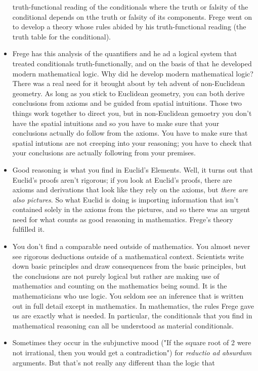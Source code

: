 \documentclass[12pt]{article}
\theoremstyle{definition}
\begin{document}
\begin{itemize}
truth-functional reading of the conditionals where the truth or falsity of the
conditional depends on tthe truth or falsity of its components. Frege went on
to develop a theory whose rules abided by his truth-functional reading (the
truth table for the conditional).
\item Frege has this analysis of the quantifiers and he ad a logical system
that treated conditionals truth-functionally, and on the basis of that he
developed modern mathematical logic. Why did he develop modern mathematical
logic? There was a real need for it brought about by teh advent of
non-Euclidean geometry. As long as you stick to Euclidean geometry, you can
both derive conclusions from axioms and be guided from spatial intuitions.
Those two things work together to direct you, but in non-Euclidean gemoetry you
don't have the spatial intuitions and so you have to make sure that your
conclusions actually do follow from the axioms. You have to make sure that
spatial intutions are not creeping into your reasoning; you have to check that
your conclusions are actually following from your premises.
\item Good reasoning is what you find in Euclid's Elements. Well, it turns out
that Euclid's proofs aren't rigorous; if you look at Euclid's proofs, there are
axioms and derivations that look like they rely on the axioms, but
\textit{there are also pictures}. So what Euclid is doing is importing
information that isn't contained solely in the axioms from the pictures, and so
there was an urgent need for what counts as good reasoning in mathematics.
Frege's theory fulfilled it. 
\item You don't find a comparable need outside of mathematics. You almost never
see rigorous deductions outside of a mathematical context. Scientists write
down basic principles and draw consequences from the basic principles, but the
conclusions are not purely logical but rather are making use of mathematics and
counting on the mathematics being sound. It is the mathematicians who use
logic. You seldom see an inference that is written out in full detail except in
mathematics. In mathematics, the rules Frege gave us are exactly what is
needed. In particular, the conditionals that you find in mathematical reasoning
can all be understood as material conditionals.
\item Sometimes they occur in the subjunctive mood ("If the square root of 2
were not irrational, then you would get a contradiction") for \textit{reductio
ad absurdum} arguments. But that's not really any different than the logic that

\end{itemize}
\end{document}
